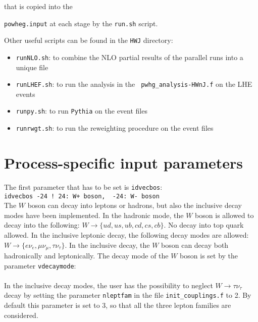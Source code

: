 \documentclass[paper]{JHEP3}
\begin{document}
that is copied into the {{\tt powheg.input} at each stage by the {\tt run.sh}
  script.

Other useful scripts can be found in the {\tt HWJ} directory:
\begin{itemize}
\item {\tt runNLO.sh}: to combine the NLO partial results of the parallel
  runs into a unique file

\item {\tt runLHEF.sh}: to run the analysis in the {\tt
  pwhg\_analysis-HWnJ.f} on the LHE events

\item {\tt runpy.sh}: to run {\tt Pythia} on the event files

\item {\tt runrwgt.sh}: to run the reweighting procedure on the event files

\end{itemize}




\section{Process-specific input parameters}


The first parameter that has to be set is {\tt idvecbos}:\\
{\tt idvecbos -24 \quad \qquad ! 24: W+ boson, \   -24: W- boson}\\

\noindent The $W$ boson can decay into leptons or hadrons, but also
the inclusive decay modes have been implemented.  In the hadronic mode,
the $W$ boson is allowed to decay into the following: $W \to \{ ud,
us, ub, cd, cs, cb\}$. No decay into top quark allowed.  In the
inclusive leptonic decay, the following decay modes are allowed: $W
\to \{e \nu_e, \mu \nu_\mu, \tau \nu_\tau\}$. In the inclusive decay,
the $W$ boson can decay both hadronically and leptonically. The decay
mode of the $W$ boson is set by the parameter {\tt vdecaymode}:\\
\\

\noindent In the inclusive decay modes, the user has the possibility to
neglect $W \to \tau\nu_\tau$ decay by setting the parameter {\tt nleptfam}
in the file {\tt init\_couplings.f} to 2. By default this parameter is set to
3, so that all the three lepton families are considered.\\

}
\end{document}

